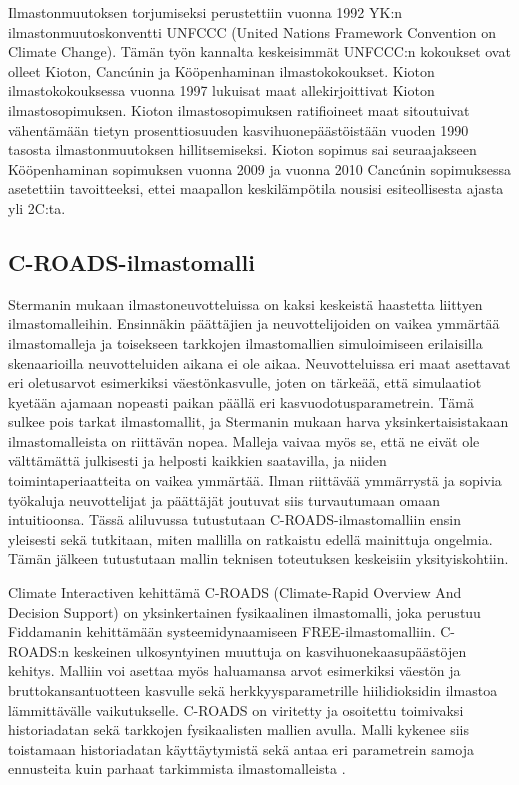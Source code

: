 \documentclass[finnish,12pt,a4paper,pdftex]{article}
\begin{document}
\begin{onehalfspacing}
Ilmastonmuutoksen torjumiseksi perustettiin vuonna 1992 YK:n ilmastonmuutoskonventti UNFCCC (United Nations Framework Convention on Climate Change). Tämän työn kannalta keskeisimmät UNFCCC:n kokoukset ovat olleet Kioton, Cancúnin ja Kööpenhaminan ilmastokokoukset. Kioton ilmastokokouksessa vuonna 1997 lukuisat maat allekirjoittivat Kioton ilmastosopimuksen. Kioton ilmastosopimuksen ratifioineet maat sitoutuivat vähentämään tietyn prosenttiosuuden kasvihuonepäästöistään vuoden 1990 tasosta ilmastonmuutoksen hillitsemiseksi. Kioton sopimus sai seuraajakseen Kööpenhaminan sopimuksen vuonna 2009 ja vuonna 2010 Cancúnin sopimuksessa asetettiin tavoitteeksi, ettei maapallon keskilämpötila nousisi esiteollisesta ajasta yli 2\degree C:ta. \cite{UNFCCC} 

\subsection{C-ROADS-ilmastomalli \label{ilmasto:croads}}

Stermanin \cite{CroadsFlightSimulator2011} mukaan ilmastoneuvotteluissa on kaksi keskeistä haastetta liittyen ilmastomalleihin. Ensinnäkin päättäjien ja neuvottelijoiden on vaikea ymmärtää ilmastomalleja ja toisekseen tarkkojen ilmastomallien simuloimiseen erilaisilla skenaarioilla neuvotteluiden aikana ei ole aikaa. Neuvotteluissa eri maat asettavat eri oletusarvot esimerkiksi väestönkasvulle, joten on tärkeää, että simulaatiot kyetään ajamaan nopeasti paikan päällä eri kasvuodotusparametrein. Tämä sulkee pois tarkat ilmastomallit, ja Stermanin \cite{CroadsFlightSimulator2011} mukaan harva yksinkertaisistakaan ilmastomalleista on riittävän nopea. Malleja vaivaa myös se, että ne eivät ole välttämättä julkisesti ja helposti kaikkien saatavilla, ja niiden toimintaperiaatteita on vaikea ymmärtää. Ilman riittävää ymmärrystä ja sopivia työkaluja neuvottelijat ja päättäjät joutuvat siis turvautumaan omaan intuitioonsa. Tässä aliluvussa tutustutaan C-ROADS-ilmastomalliin ensin yleisesti sekä tutkitaan, miten mallilla on ratkaistu edellä mainittuja ongelmia. Tämän jälkeen tutustutaan mallin teknisen toteutuksen keskeisiin yksityiskohtiin. 

Climate Interactiven kehittämä C-ROADS (Climate-Rapid Overview And Decision Support) on yksinkertainen fysikaalinen ilmastomalli, joka perustuu Fiddamanin \cite{Fiddaman1997} kehittämään systeemidynaamiseen FREE-ilmastomalliin. C-ROADS:n keskeinen ulkosyntyinen muuttuja on kasvihuonekaasupäästöjen kehitys. Malliin voi asettaa myös haluamansa arvot esimerkiksi väestön ja bruttokansantuotteen kasvulle sekä herkkyysparametrille hiilidioksidin ilmastoa lämmittävälle vaikutukselle. \cite{CroadsFlightSimulator2011, Croads} C-ROADS on viritetty ja osoitettu toimivaksi historiadatan sekä tarkkojen fysikaalisten mallien avulla. Malli kykenee siis toistamaan historiadatan käyttäytymistä sekä antaa eri parametrein samoja ennusteita kuin parhaat tarkimmista ilmastomalleista  \cite{CroadsWWW, CroadsFlightSimulator2011}.


\end{onehalfspacing}
\end{document}
